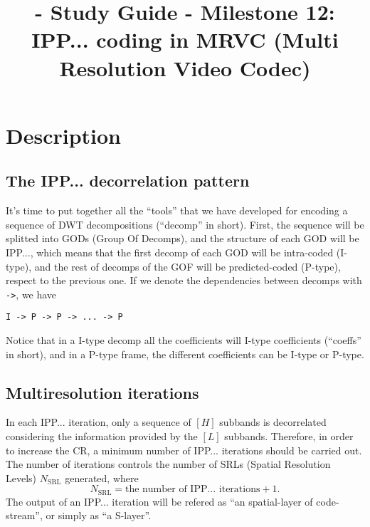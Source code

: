 
\title{\SM{} - Study Guide - Milestone 12: IPP... coding in MRVC (Multi Resolution Video Codec)}

\maketitle

\section{Description}

\subsection{The IPP... decorrelation pattern}
It's time to put together all the ``tools'' that we have developed for
encoding a sequence of DWT decompositions (``decomp'' in short). First,
the sequence will be splitted into GODs (Group Of Decomps), and the
structure of each GOD will be IPP..., which means that the first
decomp of each GOD will be intra-coded (I-type), and the rest of
decomps of the GOF will be predicted-coded (P-type), respect to the
previous one. If we denote the dependencies between decomps with
\texttt{->}, we have
\begin{verbatim}
I -> P -> P -> ... -> P
\end{verbatim}
Notice that in a I-type decomp all the coefficients will I-type
coefficients (``coeffs'' in short), and in a P-type frame, the
different coefficients can be I-type or P-type.

\subsection{Multiresolution iterations}
In each IPP... iteration, only a sequence of $[H]$ subbands is
decorrelated considering the information provided by the $[L]$
subbands. Therefore, in order to increase the CR, a minimum number of
IPP... iterations should be carried out. The number of iterations
controls the number of SRLs (Spatial Resolution Levels)
$N_{\text{SRL}}$ generated, where
\begin{equation}
  N_{\text{SRL}} = \text{the number of IPP... iterations} + 1.
\end{equation}
The output of an IPP... iteration will be refered as ``an
spatial-layer of code-stream'', or simply as ``a S-layer''.

